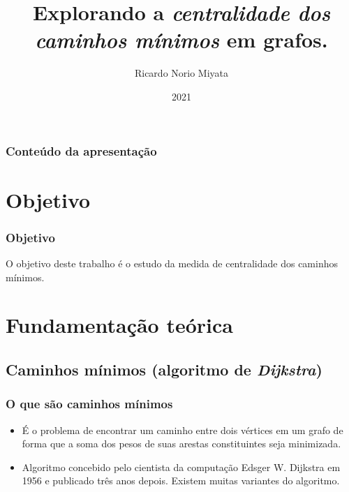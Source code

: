 \documentclass{beamer}
\title[APSP]{Explorando a \emph{centralidade dos caminhos mínimos} em grafos.} %
\author{Ricardo Norio Miyata} %
\institute[UFPR] %
{
Universidade Federal do Paraná \\ %
\medskip
\textit{rnm16@inf.ufpr.br} %
}
\date{2021} %
\begin{document}
\begin{frame}
\titlepage %
\end{frame}

\begin{frame}
\frametitle{Conteúdo da apresentação} %
\tableofcontents %
\end{frame}

\section{Objetivo}
    \begin{frame}
        \frametitle{Objetivo}
        O objetivo deste trabalho é o estudo da medida de centralidade dos caminhos mínimos.
    \end{frame}

\section{Fundamentação teórica}
    \subsection{Caminhos mínimos (algoritmo de \emph{Dijkstra})}
        \begin{frame}
            \frametitle{O que são caminhos mínimos}
            \begin{itemize}
                \item É o problema de encontrar um caminho entre dois vértices em um grafo de forma que a soma dos pesos de suas arestas constituintes seja minimizada.
                \item Algoritmo concebido pelo cientista da computação Edsger W. Dijkstra em 1956 e publicado três anos depois. Existem muitas variantes do algoritmo.
            \end{itemize}
        \end{frame}
\end{document}
